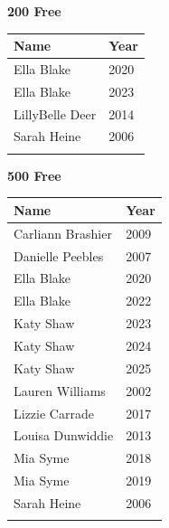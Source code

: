 \vspace{0.5em}
\noindent\begin{minipage}[t]{0.48\textwidth}
\centering
\textbf{\textcolor{teamprimary}{200 Free}}\par
\vspace{0.5em}
\centering
\small
\renewcommand{\arraystretch}{1.0}
\setlength{\tabcolsep}{4pt}
\begin{tabular}{@{}p{3.0cm}p{1.0cm}@{}}
\toprule
\textbf{Name} & \textbf{Year} \\
\midrule
Ella Blake & 2020 \\
Ella Blake & 2023 \\
LillyBelle Deer & 2014 \\
Sarah Heine & 2006 \\
\bottomrule
\vspace{0.5em}
\end{tabular}
\end{minipage}
\hfill
\begin{minipage}[t]{0.48\textwidth}
\centering
\textbf{\textcolor{teamprimary}{500 Free}}\par
\vspace{0.5em}
\centering
\small
\renewcommand{\arraystretch}{1.0}
\setlength{\tabcolsep}{4pt}
\begin{tabular}{@{}p{3.0cm}p{1.0cm}@{}}
\toprule
\textbf{Name} & \textbf{Year} \\
\midrule
Carliann Brashier & 2009 \\
Danielle Peebles & 2007 \\
Ella Blake & 2020 \\
Ella Blake & 2022 \\
Katy Shaw & 2023 \\
Katy Shaw & 2024 \\
Katy Shaw & 2025 \\
Lauren Williams & 2002 \\
Lizzie Carrade & 2017 \\
Louisa Dunwiddie & 2013 \\
Mia Syme & 2018 \\
Mia Syme & 2019 \\
Sarah Heine & 2006 \\
\bottomrule
\vspace{0.5em}
\end{tabular}
\end{minipage}
\vspace{1.2em}
